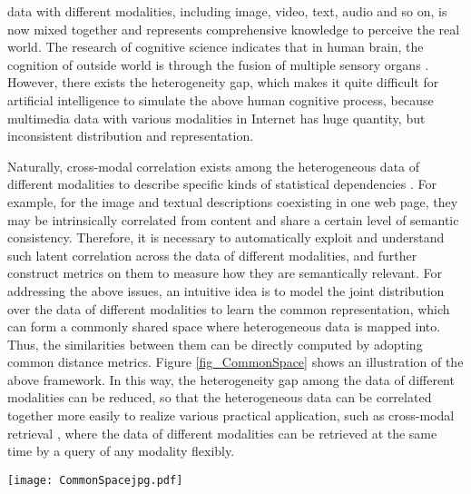 \documentclass[journal]{IEEEtran}
\begin{document}
 data with different modalities, including image, video, text, audio and so on, is now mixed together and represents comprehensive knowledge to perceive the real world. The research of cognitive science indicates that in human brain, the cognition of outside world is through the fusion of multiple sensory organs \cite{mcgurk1976hearing}. However, there exists the heterogeneity gap, which makes it quite difficult for artificial intelligence to simulate the above human cognitive process, because multimedia data with various modalities in Internet has huge quantity, but inconsistent distribution and representation. 

Naturally, cross-modal correlation exists among the heterogeneous data of different modalities to describe specific kinds of statistical dependencies \cite{peng2017cross}. For example, for the image and textual descriptions coexisting in one web page, they may be intrinsically correlated from content and share a certain level of semantic consistency. 
Therefore, it is necessary to automatically exploit and understand such latent correlation across the data of different modalities, and further construct metrics on them to measure how they are semantically relevant. For addressing the above issues, an intuitive idea is to model the joint distribution over the data of different modalities to learn the common representation, which can form a commonly shared space where heterogeneous data is mapped into. Thus, the similarities between them can be directly computed by adopting common distance metrics. Figure \ref{fig_CommonSpace} shows an illustration of the above framework. In this way, the heterogeneity gap among the data of different modalities can be reduced, so that the heterogeneous data can be correlated together more easily to realize various practical application, such as cross-modal retrieval \cite{peng2017overview}, where the data of different modalities can be retrieved at the same time by a query of any modality flexibly.

\begin{figure*}[!t]
	\centering
	\texttt{[image: CommonSpacejpg.pdf]}
	\caption{Illustrations of mainstream framework for constructing the cross-modal correlation learning, which aims to project the heterogeneous data of different modalities from their own feature spaces into one common space, where similarity measurement can be directly adopted to establish correlation on the cross-modal data.
	}
	\label{fig_CommonSpace}
\end{figure*}
\end{document}
